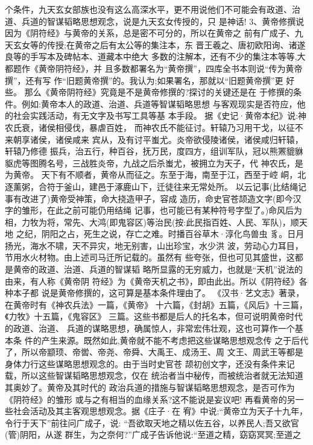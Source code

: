 \documentclass[12pt,UTF8]{ctexbook}
\begin{document}
个条件，九天玄女部族也没有这么高深水平，更不用说他们不可能会有政道、治道、兵道的智谋韬略思想观念，说是九天玄女传授的，只
是神话!
3、黄帝修撰说
因为《阴符经》与黄帝的关系，总是密不可分的，所以在黄帝之
前有广成子、九天玄女等的传授;在黄帝之后有太公等的集注本，东
晋王羲之、唐初欧阳询、诸遂良等的手写本及碑帖本、道藏本中绝大
多数的注解本，还有不少的集注本等等,大都题作《黄帝阴符经》，并
且多数都署名为“黄帝撰”，四库全书本则说“传为黄帝撰”，还有写
作“旧题黄帝撰”的。我认为;如果署名，那就以“旧题黄帝撰”更
好些。
那么《黄帝阴符经》究竟是不是黄帝修撰的?探讨的关键还是在
于修撰的条件。例如:黄帝本人的政道、治道、兵道等智谋韬略思想
与客观现实是否符应，他的社会实践活动，有无文字及书写工具等基
本手段。
据《史记·黄帝本纪》说:神农氏衰，诸侯相侵伐，暴虐百姓，
而神农氏不能征讨。轩辕乃习用干戈，以征不来朝享诸侯，诸侯咸来
宾从，及有讨平蚩尤。炎帝欲侵陵诸侯，诸侯咸归轩辕，轩辕乃修德
振兵，治五行，种百谷，抚万民，度四方，组训军队，冠以熊罴貔貅
䝙虎等图腾名号，三战胜炎帝，九战之后杀蚩尤，被拥立为天子，代
神农氏，是为黄帝。
天下有不顺者，黄帝从而征之。东至于海，南至于江，西至于崆
峒，北逐薰粥，合符于釜山，建邑于涿鹿山下，迁徒往来无常处所。
以云记事(比结绳记事有改进了)黄帝受神策，命大挠造甲子，容成
造历，命史官苍颉造文字(即今汉字的雏形，在此之前可能仍用结绳
记事，也可能已有某种符号字型了。)命风后为相，力牧为将，常先、大鸿(即鬼容区)等治民(按:此民指百姓、人民、军队)，顺天地
之纪，阴阳之占，死生之说，存亡之难。时播百谷草木·淳化鸟兽虫
豸。日月扬光，海水不啸，天不异灾，地无别害，山出珍宝，水少洪
波，劳动心力耳目，节用水火材物。由上述司马迁所记载的。虽然有
些夸张，但也可见其盛世，这都是黄帝的政道、治道、兵道的智谋韬
略所显露的无穷威力，也就是“天机”说法的由来，有人称《黄帝阴
符经》为《黄帝天机之书》，即由此出。所以《阴符经》各种本子都
说是黄帝修撰的，这可算是基本条件理由了。
《汉书·艺文志》著录，在黄帝时有《神农兵法》一篇，《黄帝》
十六篇，《封胡》五篇，《风后》十三篇，《力牧》十五篇，《鬼容区》
三篇。这些书都是后人的托名本，但可说明黄帝时代的政道、治道、
兵道的谋略思想，确属惊人，非常宏伟壮观，这也可算作一个基本条
件的产生来源。既然如此,黄帝就不能不考虑把这些谋略思想观念传
之于后代了，所以帝颛顼、帝喾、帝尧、帝舜、大禹王、成汤王、周
文王、周武王等都是身体力行这些谋略思想观念的。由于当时史官苍
颉初创文字，还没有条件来记载，所以这些智谋韬略思想观念，仅在
统治者当中秘传，而被统治者就无法知道其奥妙了。黄帝及其时代的
政治兵道的措施与智谋韬略思想观念，是否可作为《阴符经》的雏形
或与之有相当的血缘关系?这不能说是妄议吧!
再看黄帝的另一些社会活动及其主客观思想观念。据《庄子·在
宥》中说;“黄帝立为天子十九年，令行于天下”前往问广成子，说:
“吾欲取天地之精以佐五谷，以养民人;吾又欲官(管)阴阳，从遂
群生，为之奈何?”广成子告诉他说:“至道之精，窈窈冥冥;至道之
\end{document}
